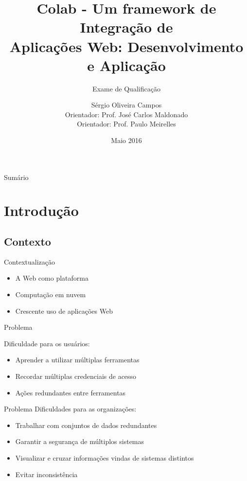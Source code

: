 \documentclass{beamer}
\title[Colab - Um framework de Integração de Aplicações Web]
{Colab - Um framework de Integração de\\Aplicações Web: Desenvolvimento e Aplicação}
\subtitle{Exame de Qualificação}
\author[Sérgio Oliveira Campos (ICMC) – 2016]{Sérgio Oliveira Campos\inst{1}\\{\small Orientador: Prof. José Carlos Maldonado\inst{1}}\\{\small Orientador: Prof. Paulo Meirelles\inst{2}}}
\institute[ICMC] %
{
  \inst{1}%
  Instituto de Ciências Matemáticas e de Computação – ICMC\\
  Universidade de São Paulo
  
  \and
  \inst{2}%
  Faculdade de Engenharias do Gama – FGA\\
  Universidade de Brasília
}
\date{Maio 2016}
\begin{document}
\begin{frame}
  \titlepage
\end{frame}

\begin{frame}{Sumário}
  \tableofcontents
\end{frame}

\section{Introdução}

\subsection{Contexto}

\begin{frame}{Contextualização}

  \begin{itemize}
  \item {
    A Web como plataforma \cite{OReilly2007}
  }
  \item{
    Computação em nuvem
  }
  \item {
    Crescente uso de aplicações Web
  }
  \end{itemize}
 
\end{frame}


\begin{frame}{Problema}

  Dificuldade para os usuários:  
  \begin{itemize}
  \item {
    Aprender a utilizar múltiplas ferramentas
  }
  \item {
    Recordar múltiplas credenciais de acesso
  }
  \item {
    Ações redundantes entre ferramentas
  }
  \end{itemize}
\end{frame}

\begin{frame}{Problema}
  Dificuldades para as organizações:
  \begin{itemize}

  \item {
    Trabalhar com conjuntos de dados redundantes
  }
  \item {
    Garantir a segurança de múltiplos sistemas
  }
  \item {
    Visualizar e cruzar informações vindas de sistemas distintos
  }
  \item {
    Evitar inconsistência
  }
  
  \end{itemize}
\end{frame}
\end{document}
